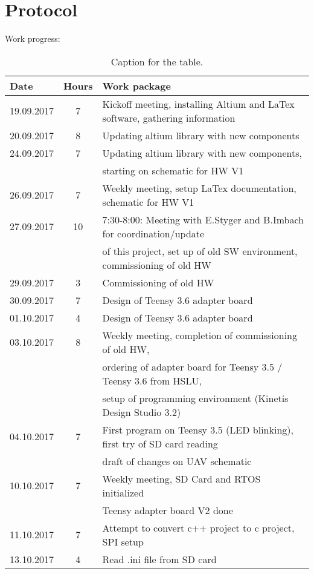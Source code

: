 \section*{Protocol}
Work progress:

\begin{table}[tp]
  \caption{Caption for the table.}
  \label{tab:table1}
  \begin{tabular}{lcl}
  \toprule%
    Date & 			Hours & 		Work package													\\\midrule
    19.09.2017 &		7 &			Kickoff meeting, installing Altium and LaTex software, gathering information 	\\
    20.09.2017 &		8 &			Updating altium library with new components 					\\
    24.09.2017 & 	7 &			Updating altium library with new components,					\\
    &				&			starting on schematic for HW V1 								\\
    26.09.2017 &		7 &			Weekly meeting, setup LaTex documentation, schematic for HW V1 	\\
    27.09.2017 &		10 &			7:30-8:00: Meeting with E.Styger and B.Imbach for coordination/update \\
    &				&			of this project, set up of old SW environment, commissioning of old HW \\
    29.09.2017 &		3 &			Commissioning of old HW 	\\
    30.09.2017 &		7 &			Design of Teensy 3.6 adapter board \\
    01.10.2017 &		4 &			Design of Teensy 3.6 adapter board \\
    03.10.2017 &		8 &			Weekly meeting, completion of commissioning of old HW, 	\\
    &				&			ordering of adapter board for Teensy 3.5 / Teensy 3.6 from HSLU,\\
    &				&			setup of programming environment (Kinetis Design Studio 3.2) \\
    04.10.2017 &		7 &			First program on Teensy 3.5 (LED blinking), first try of SD card reading \\
    &				&			draft of changes on UAV schematic \\
    10.10.2017 &		7 &			Weekly meeting, SD Card and RTOS initialized \\
    &				&			Teensy adapter board V2 done \\
    11.10.2017 &		7 &			Attempt to convert c++ project to c project, SPI setup \\
    13.10.2017 &		4 &			Read .ini file from SD card\\

\end{tabular}
\end{table}
